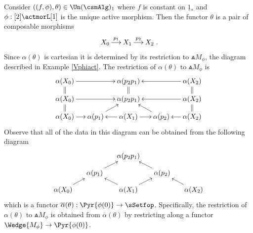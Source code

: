 \documentclass[a4paper]{article}
\numberwithin{equation}{section}
\begin{document}
Consider $\left((f,\phi),\theta\right) \in \Un(\csmAlg)_1$ where $f$ is constant on $\underline{1}_\ast$ and $\phi:[2] \actmorL [1]$ is the unique active morphism. Then the functor $\theta$ is a pair of composable morphisms
\begin{equation*}
\xymatrixcolsep{1.1pc}\xymatrix{X_0 \ar[r]^-{p_1} & X_1 \ar[r]^-{p_2} & X_2}. 
 \end{equation*}
 Since $\alpha(\theta)$ is cartesian it is determined by its restriction to $\Wedge{M_\phi}$, the diagram described in Example \ref{Vphiact}. The restriction of $\alpha(\theta)$ to $\Wedge{M_\phi}$ is
 \begin{equation*}
  \xymatrixrowsep{.8pc} \xymatrixcolsep{1.1pc} \xymatrix{\alpha(X_0) \ar[rr] \ar@{=}[d]  & & \alpha(p_2p_1) \ar@{=}[d] & & \alpha(X_2) \ar[ll] \ar@{=}[d] \\
  \alpha(X_0) \ar[rr] & & \alpha(p_2p_1) & & \alpha(X_2)\ar[ll] \\
  \alpha(X_0) \ar@{=}[u] \ar[r] & \alpha(p_1) \ar[ru] & \alpha(X_1) \ar[l] \ar[r] & \alpha(p_2) \ar[lu] & \alpha(X_2) \ar[l] \ar@{=}[u] }
 \end{equation*}
 Observe that all of the data in this diagram can be obtained from the following diagram
 \begin{equation}
 \label{alphabarexam}
  \xymatrixrowsep{.7pc}\xymatrixcolsep{1.2pc} \xymatrix{ & & \alpha(p_2 p_1) & & \\
  & \alpha(p_1) \ar[ru] & & \alpha(p_2) \ar[lu] & \\
  \alpha(X_0) \ar[ru] & & \alpha(X_1) \ar[lu] \ar[ru] & & \alpha(X_2) \ar[lu] }
 \end{equation}
which is a functor $\overline{\alpha}(\theta): \Pyr{\phi(0)} \to \sSetfop$. Specifically, the restriction of $\alpha(\theta)$ to $\Wedge{M_\phi}$ is obtained from $\overline{\alpha}(\theta)$ by restricting along a functor $\Wedge{M_\phi} \to \Pyr{\phi(0)}$.
\end{document}
